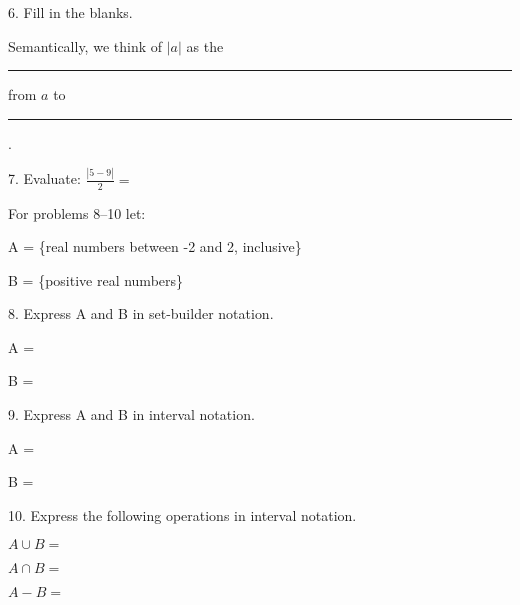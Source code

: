 \documentclass[letterpaper, 12pt]{article}
\begin{document}
\vspace{0.5in}

6. Fill in the blanks.

\bigskip

Semantically, we think of $|a|$ as the \rule{1in}{1pt} from $a$ to
\rule{0.5in}{1pt}.

\vspace{0.5in}

7. Evaluate: $\frac{|5-9|}{2} = $

\pagebreak

For problems 8--10 let:

\bigskip

A = \{real numbers between -2 and 2, inclusive\}

B = \{positive real numbers\}

\vspace{0.5in}

8. Express A and B in set-builder notation.

\bigskip

A = 

\bigskip

B =

\vspace{0.5in}

9. Express A and B in interval notation.

\bigskip

A =

\bigskip

B =

\vspace{0.5in}

10. Express the following operations in interval notation.

\bigskip

$A \cup B = $

\bigskip

$A \cap B = $

\bigskip

$A - B = $
\end{document}
